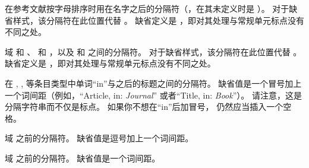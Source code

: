 \begin{ltxsyntax}
\DeprecatedMark
在参考文献按字母排序时用在名字之后的分隔符（，在其未定义时是 ）。
对于缺省样式，该分隔符在此位置代替 。
缺省定义是 ，即对其处理与常规单元标点没有不同之处。

域  和 、 和 ，以及  和  之间的分隔符。
对于缺省样式，该分隔符在此位置代替 。
缺省定义是 ，即对其处理与常规单元标点没有不同之处。

在 , ,  等条目类型中单词“in”与之后的标题之间的分隔符。
缺省值是一个冒号加上一个词间距（例如，“Article, in: \emph{Journal}” 或者“Title, in: \emph{Book}”）。
请注意，这是分隔字符串而不仅是标点。
如果你不想在“in”后加冒号， 仍然应当插入一个空格。

域  之前的分隔符。
缺省值是逗号加上一个词间距。

域  之前的分隔符。
缺省值是一个词间距。


\end{ltxsyntax}
